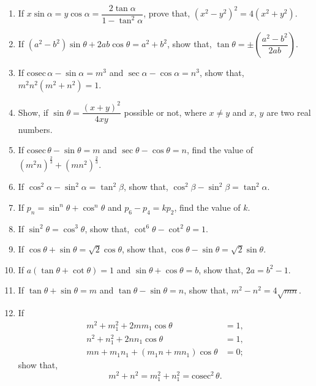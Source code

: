 \documentclass[11pt, a4paper]{article}
\begin{document}
\begin{enumerate}
	\item If $x \sin \alpha = y \cos \alpha = \dfrac{2\tan \alpha}{1 - \tan^2 \alpha}$, prove that, $(x^2 - y^2)^2 = 4(x^2 + y^2).$
	
	\item If $(a^2 - b^2) \sin \theta + 2ab \cos \theta = a^2 + b^2$, show that, $\tan \theta = \pm \left( \dfrac{a^2 - b^2}{2ab} \right).$
	
	\item If $\mathrm{cosec\,} \alpha - \sin \alpha = m^3$ and $\sec \alpha - \cos \alpha = n^3$, show that, $m^2n^2(m^2 + n^2) = 1.$
	
	\item Show, if $\sin \theta = \dfrac{(x+y)^2}{4xy}$ possible or not, where $x\neq y$ and $x$, $y$ are two real numbers.
	
	\item If $\mathrm{cosec\,} \theta - \sin \theta = m$ and $\sec \theta - \cos \theta = n$, find the value of $(m^2n)^{\frac{2}{3}} + (mn^2)^{\frac{2}{3}}.$

	\item If $\cos^2 \alpha - \sin^2 \alpha = \tan^2 \beta$, show that, $\cos^2 \beta - \sin^2 \beta = \tan^2 \alpha.$
	
	\item If $p_n = \sin^n \theta + \cos^n \theta$ and $p_6 - p_4 = kp_2$, find the value of $k$.
	
	\item If $\sin^2 \theta = \cos^3 \theta$, show that, $\cot^6 \theta - \cot^2 \theta = 1.$
	
	\item If $\cos \theta + \sin \theta = \sqrt{2}\cos \theta$, show that, $\cos \theta - \sin \theta = \sqrt{2}\sin \theta.$
	
	\item If $a(\tan \theta + \cot \theta) = 1$ and $\sin \theta + \cos \theta = b$, show that, $2a = b^2 - 1.$
	
	\item If $\tan \theta + \sin \theta = m$ and $\tan \theta - \sin \theta = n$, show that, $m^2 - n^2 = 4\sqrt{mn}.$
	
	\item If
		\begin{align*}
			m^2 + m_1 ^2 + 2m m_1 \cos \theta &= 1, \\
			n^2 + n_1 ^2 + 2n n_1 \cos \theta &= 1, \\
			mn + m_1 n_1 + (m_1 n + m n_1) \cos \theta &= 0;
		\end{align*}
		show that, $$ m^2 + n^2 = m_1 ^2 + n_1 ^2 = \mathrm{cosec^2\,} \theta. $$
		

\end{enumerate}
\end{document}
